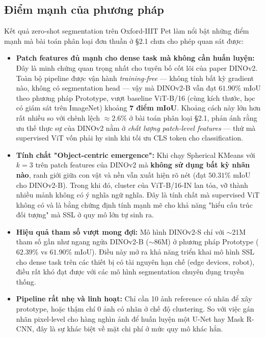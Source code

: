 \subsection{Điểm mạnh của phương pháp}
Kết quả zero-shot segmentation trên Oxford-IIIT Pet làm nổi bật những điểm mạnh mà bài toán phân loại đơn thuần ở §2.1 chưa cho phép quan sát được:
\begin{itemize}
    \item \textbf{Patch features đủ mạnh cho dense task mà không cần huấn luyện:} Đây là minh chứng quan trọng nhất cho tuyên bố cốt lõi của paper DINOv2. Toàn bộ pipeline được vận hành \textit{training-free} — không tính bất kỳ gradient nào, không có segmentation head — vậy mà DINOv2-B vẫn đạt $61.90\%$ mIoU theo phương pháp Prototype, vượt baseline ViT-B/16 (cùng kích thước, học có giám sát trên ImageNet) khoảng \textbf{7 điểm mIoU}. Khoảng cách này lớn hơn rất nhiều so với chênh lệch $\approx 2.6\%$ ở bài toán phân loại §2.1, phản ánh rằng ưu thế thực sự của DINOv2 nằm ở \textit{chất lượng patch-level features} — thứ mà supervised ViT vốn phải hy sinh khi tối ưu CLS token cho classification.
    \item \textbf{Tính chất "Object-centric emergence":} Khi chạy Spherical KMeans với $k=3$ trên patch features của DINOv2 mà \textbf{không sử dụng bất kỳ nhãn nào}, ranh giới giữa con vật và nền vẫn xuất hiện rõ nét (đạt $50.31\%$ mIoU cho DINOv2-B). Trong khi đó, cluster của ViT-B/16-IN lan tỏa, vỡ thành nhiều mảnh không có ý nghĩa ngữ nghĩa. Đây là tính chất mà supervised ViT không có và là bằng chứng định tính mạnh mẽ cho khả năng "hiểu cấu trúc đối tượng" mà SSL ở quy mô lớn tự sinh ra.
    \item \textbf{Hiệu quả tham số vượt mong đợi:} Mô hình DINOv2-S chỉ với $\sim$21M tham số gần như ngang ngửa DINOv2-B ($\sim$86M) ở phương pháp Prototype ($62.39\%$ vs $61.90\%$ mIoU). Điều này mở ra khả năng triển khai mô hình SSL cho dense task trên các thiết bị có tài nguyên hạn chế (edge devices, robot), điều rất khó đạt được với các mô hình segmentation chuyên dụng truyền thống.
    \item \textbf{Pipeline rất nhẹ và linh hoạt:} Chỉ cần 10 ảnh reference có nhãn để xây prototype, hoặc thậm chí 0 ảnh có nhãn ở chế độ clustering. So với việc gán nhãn pixel-level cho hàng nghìn ảnh để huấn luyện một U-Net hay Mask R-CNN, đây là sự khác biệt về mặt chi phí ở mức quy mô khác hẳn.
\end{itemize}


